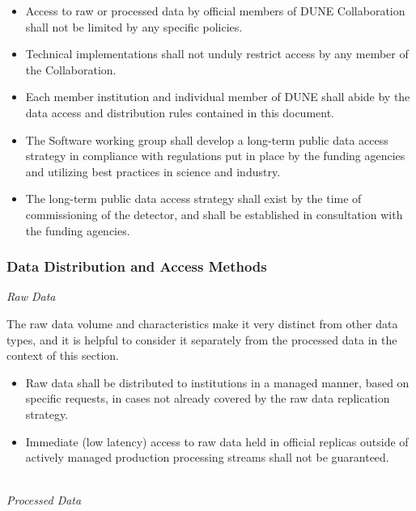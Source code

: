\begin{itemize}
\item Access to raw or processed data by official members of DUNE Collaboration  shall not be limited by any specific policies.

\item Technical implementations shall not unduly restrict access by any member of the Collaboration.

\item Each member institution and individual member of  DUNE shall abide by the data access and distribution rules contained in this document.

\item The Software working group shall develop a long-term public data access strategy in compliance with regulations put in place by the funding agencies and utilizing best practices in science and industry.

\item The long-term public data access strategy shall exist by the time of commissioning of the detector, and shall be established in consultation with the funding agencies.
\end{itemize}

\subsubsection{Data Distribution and Access Methods}
\textit{Raw Data}

The raw data volume and characteristics make it very distinct from other data types, and it is helpful to consider it separately from the processed data in the context of this section. 
\begin{itemize}
\item Raw data shall be distributed to institutions in a managed manner, based on specific requests, in cases not already covered by the raw data replication strategy.

\item Immediate (low latency) access to raw data held in official replicas outside of actively managed production processing streams shall not be guaranteed.
\end{itemize}
\ 
\\
\textit{Processed Data}

